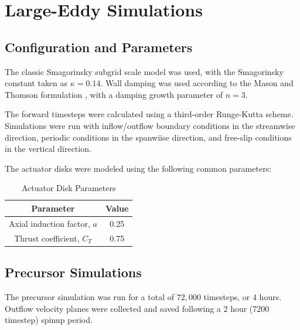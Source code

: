 \documentclass[11pt]{article}
\begin{document}
\newpage

\printbibliography

\newpage

\appendix 


\section{Large-Eddy Simulations}

\subsection{Configuration and Parameters}

The classic Smagorinsky subgrid scale model was used, with the Smagorinsky
constant taken as $\kappa = 0.14$. Wall damping was used according to the
Mason and Thomson formulation \cite{masonStochasticBackscatterLargeeddy1992},
with a damping growth parameter of $n = 3$.

The forward timesteps were calculated using a third-order Runge-Kutta scheme.
Simulations were run with inflow/outflow boundary conditions in the streamwise
direction, periodic conditions in the spanwiise direction, and free-slip
conditions in the vertical direction.

The actuator disks were modeled using the following common parameters:

\begin{table}[h]
    \centering
    \caption{Actuator Disk Parameters}

    \vspace{0.75em}

    \begin{tabular}{c|c}
        Parameter & Value \\
        \hline
        Axial induction factor, $a$ & 0.25 \\
        Thrust coefficient, $C_T$ & 0.75
    \end{tabular}

\end{table}

\subsection{Precursor Simulations}

The precursor simulation was run for a total of $72,000$ timesteps, or 4 hours. Outflow
velocity planes were collected and saved following a 2 hour (7200 timestep) spinup period.
\end{document}

